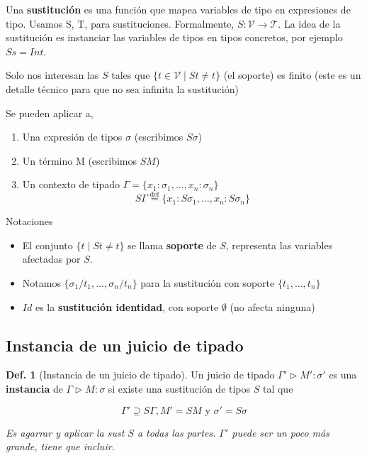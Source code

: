 \documentclass{report}
\theoremstyle{definition} %
\newtheorem{definition}{Def.}[chapter]
\newcommand{\eqdef}{\overset{\text{def}}{=}}
\newcommand{\tfunc}[2]{#1 \to #2}
\newcommand{\tipa}[3]{#1 \rhd #2 : #3} %
\newcommand{\Gtipa}[2]{\tipa{\Gamma}{#1}{#2}}
\newcommand{\typeVars}{\mathcal{V}}
\newcommand{\types}{\mathcal{T}}
\newcommand{\tsust}[1]{S#1} %
\newcommand{\sustfor}[2]{#1/#2} %
\newcommand{\GTipaInst}[2]{\tipa{\Gamma'}{#1'}{#2'}} %
\begin{document}
Una \textbf{sustitución} es una función que mapea variables de tipo en
expresiones de tipo. Usamos S, T, para sustituciones. Formalmente,
$S : \tfunc{\typeVars}{\types}$. La idea de la sustitución es instanciar las
variables de tipos en tipos concretos, por ejemplo $\tsust{s} = Int$.

Solo nos interesan las $S$ tales que $\{ t \in \typeVars \mid St \neq t \}$ (el
soporte) es finito (este es un detalle técnico para que no sea infinita la
sustitución)

Se pueden aplicar a,

\begin{enumerate}
    \item Una expresión de tipos $\sigma$ (escribimos $\tsust{\sigma}$)
    \item Un término M (escribimos $\tsust{M}$)
    \item Un contexto de tipado
    $\Gamma = \{ x_1 : \sigma_1, \dots, x_n : \sigma_n\}$
    \[
        \tsust{\Gamma} \eqdef
        \{
            x_1 : \tsust{\sigma_1}, 
            \dots,
            x_n : \tsust{\sigma_n}
        \}
    \]
\end{enumerate}

Notaciones

\begin{itemize}
    \item El conjunto $\{ t \mid \tsust{t} \neq t \}$ se llama \textbf{soporte}
    de $S$, representa las variables afectadas por $S$.
    \item Notamos $\{ \sustfor{\sigma_1}{t_1}, \dots, \sustfor{\sigma_n}{t_n} \}$
    para la sustitución con soporte $\{t_1, \dots, t_n \}$
    \item $Id$ es la \textbf{sustitución identidad}, con soporte $\emptyset$ (no
    afecta ninguna)
\end{itemize}

\subsection{Instancia de un juicio de tipado}

\begin{definition}[Instancia de un juicio de tipado]
    Un juicio de tipado $\GTipaInst{M}{\sigma}$ es una \textbf{instancia} de
    $\Gtipa{M}{\sigma}$ si existe una sustitución de tipos $S$ tal que

    \[
        \Gamma' \supseteq \tsust{\Gamma},
        M' = \tsust{M}
        \text{ y }
        \sigma' = \tsust{\sigma}
    \]

    \textit{Es agarrar y aplicar la sust $S$ a todas las partes. $\Gamma'$ puede ser un poco más grande, tiene que incluir.}
\end{definition}
\end{document}
